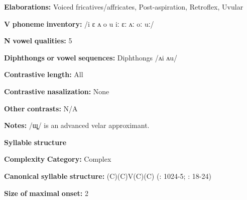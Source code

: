 \documentclass[output=paper]{langsci/langscibook}
\begin{document}
\begin{styleBody}
\textbf{Elaborations:} Voiced fricatives/affricates, Post-aspiration, Retroflex, Uvular
\end{styleBody}

\begin{styleBody}
\textbf{V} \textbf{phoneme} \textbf{inventory:} /i ɛ ʌ o u iː ɛː ʌː oː uː/
\end{styleBody}

\begin{styleBody}
\textbf{N} \textbf{vowel} \textbf{qualities:} 5
\end{styleBody}

\begin{styleBody}
\textbf{Diphthongs} \textbf{or} \textbf{vowel} \textbf{sequences:} Diphthongs /ʌi ʌu/
\end{styleBody}

\begin{styleBody}
\textbf{Contrastive} \textbf{length:} All
\end{styleBody}

\begin{styleBody}
\textbf{Contrastive} \textbf{nasalization:} None
\end{styleBody}

\begin{styleBody}
\textbf{Other} \textbf{contrasts:} N/A
\end{styleBody}

\begin{styleBody}
\textbf{Notes:} /ɰ̟/ is an advanced velar approximant.
\end{styleBody}

\begin{styleBody}
\textbf{Syllable} \textbf{structure}
\end{styleBody}

\begin{styleBody}
\textbf{Complexity} \textbf{Category:} Complex
\end{styleBody}

\begin{styleBody}
\textbf{Canonical} \textbf{syllable} \textbf{structure:} (C)(C)V(C)(C) (\citealt{Anderson1997}: 1024-5; \citealt{Yoshioka2012}: 18-24)
\end{styleBody}

\begin{styleBody}
\textbf{Size} \textbf{of} \textbf{maximal} \textbf{onset:} 2
\end{styleBody}
\end{document}
